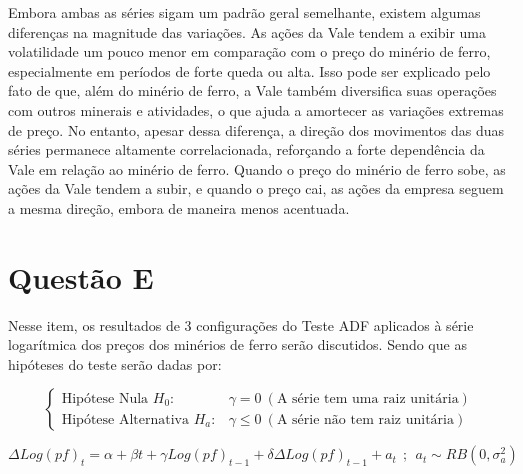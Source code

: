 \documentclass[a4paper,12pt]{article}[abntex2]
\begin{document}
Embora ambas as séries sigam um padrão geral semelhante, existem algumas diferenças na magnitude das variações. As ações da Vale tendem a exibir uma volatilidade um pouco menor em comparação com o preço do minério de ferro, especialmente em períodos de forte queda ou alta. Isso pode ser explicado pelo fato de que, além do minério de ferro, a Vale também diversifica suas operações com outros minerais e atividades, o que ajuda a amortecer as variações extremas de preço.
No entanto, apesar dessa diferença, a direção dos movimentos das duas séries permanece altamente correlacionada, reforçando a forte dependência da Vale em relação ao minério de ferro. Quando o preço do minério de ferro sobe, as ações da Vale tendem a subir, e quando o preço cai, as ações da empresa seguem a mesma direção, embora de maneira menos acentuada.

\section*{\textbf{Questão E}}

Nesse item, os resultados de 3 configurações do Teste ADF aplicados à série logarítmica dos preços dos minérios de ferro serão discutidos. Sendo que as hipóteses do teste serão dadas por:

\[
\left\{
\begin{array}{ll}
    \text{Hipótese Nula } H_0: & \gamma = 0 \ (\text{A série tem uma raiz unitária}) \\
    \text{Hipótese Alternativa } H_a: & \gamma \leqslant 0 \ (\text{A série não tem raiz unitária})
\end{array}
\right.
\]


\begin{equation}
    \Delta Log(pf)_t = \alpha + \beta t + \gamma Log(pf)_{t-1} + \delta \Delta Log(pf)_{t-1} + a_t \ \ ; \ \ a_t \sim RB(0, \sigma_a^2)   
    \label{eq:taltallpf}
\end{equation}
\end{document}
